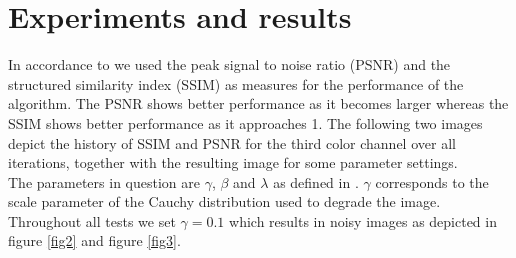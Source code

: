 \section{Experiments and results}
In accordance to \cite{MR3761275} we used the peak signal to noise ratio (PSNR) and the structured similarity index (SSIM) as measures for the performance of the algorithm. The PSNR shows better performance as it becomes larger whereas the SSIM shows better performance as it approaches 1. The following two images depict the history of SSIM and PSNR for the third color channel over all iterations, together with the resulting image for some parameter settings.\\
The parameters in question are $\gamma$, $\beta$ and $\lambda$ as defined in \cite{MR3761275}. $\gamma$ corresponds to the scale parameter of the Cauchy distribution used to degrade the image. Throughout all tests we set $\gamma=0.1$ which results in noisy images as depicted in figure \ref{fig2} and figure \ref{fig3}.\\
